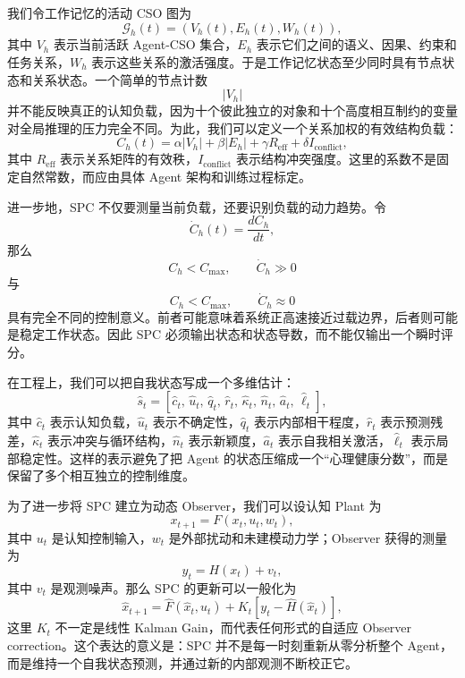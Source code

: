 我们令工作记忆的活动 CSO 图为
\begin{equation}
\mathcal G_h(t)
=
\left(
V_h(t),
E_h(t),
W_h(t)
\right),
\end{equation}
其中 $V_h$ 表示当前活跃 Agent-CSO 集合，$E_h$ 表示它们之间的语义、因果、约束和任务关系，$W_h$ 表示这些关系的激活强度。于是工作记忆状态至少同时具有节点状态和关系状态。一个简单的节点计数
\begin{equation}
|V_h|
\end{equation}
并不能反映真正的认知负载，因为十个彼此独立的对象和十个高度相互制约的变量对全局推理的压力完全不同。为此，我们可以定义一个关系加权的有效结构负载：
\begin{equation}
C_h(t)
=
\alpha |V_h|
+
\beta |E_h|
+
\gamma R_{\mathrm{eff}}
+
\delta I_{\mathrm{conflict}},
\end{equation}
其中 $R_{\mathrm{eff}}$ 表示关系矩阵的有效秩，$I_{\mathrm{conflict}}$ 表示结构冲突强度。这里的系数不是固定自然常数，而应由具体 Agent 架构和训练过程标定。

进一步地，SPC 不仅要测量当前负载，还要识别负载的动力趋势。令
\begin{equation}
\dot C_h(t)
=
\frac{dC_h}{dt},
\end{equation}
那么
\begin{equation}
C_h<C_{\max},
\qquad
\dot C_h\gg 0
\end{equation}
与
\begin{equation}
C_h<C_{\max},
\qquad
\dot C_h\approx 0
\end{equation}
具有完全不同的控制意义。前者可能意味着系统正高速接近过载边界，后者则可能是稳定工作状态。因此 SPC 必须输出状态和状态导数，而不能仅输出一个瞬时评分。

在工程上，我们可以把自我状态写成一个多维估计：
\begin{equation}
\hat s_t
=
\left[
\hat c_t,\,
\hat u_t,\,
\hat q_t,\,
\hat r_t,\,
\hat \kappa_t,\,
\hat n_t,\,
\hat a_t,\,
\hat \ell_t
\right],
\end{equation}
其中 $\hat c_t$ 表示认知负载，$\hat u_t$ 表示不确定性，$\hat q_t$ 表示内部相干程度，$\hat r_t$ 表示预测残差，$\hat \kappa_t$ 表示冲突与循环结构，$\hat n_t$ 表示新颖度，$\hat a_t$ 表示自我相关激活，$\hat \ell_t$ 表示局部稳定性。这样的表示避免了把 Agent 的状态压缩成一个“心理健康分数”，而是保留了多个相互独立的控制维度。

为了进一步将 SPC 建立为动态 Observer，我们可以设认知 Plant 为
\begin{equation}
x_{t+1}
=
F(x_t,u_t,w_t),
\end{equation}
其中 $u_t$ 是认知控制输入，$w_t$ 是外部扰动和未建模动力学；Observer 获得的测量为
\begin{equation}
y_t
=
H(x_t)+v_t,
\end{equation}
其中 $v_t$ 是观测噪声。那么 SPC 的更新可以一般化为
\begin{equation}
\hat x_{t+1}
=
\hat F(\hat x_t,u_t)
+
K_t
\left[
y_t-\hat H(\hat x_t)
\right],
\end{equation}
这里 $K_t$ 不一定是线性 Kalman Gain，而代表任何形式的自适应 Observer correction。这个表达的意义是：SPC 并不是每一时刻重新从零分析整个 Agent，而是维持一个自我状态预测，并通过新的内部观测不断校正它。


